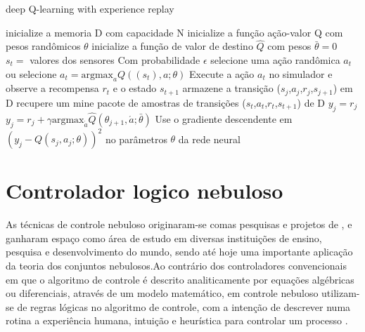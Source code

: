 \documentclass[
	12pt,				%
	openright,			%
	oneside,			%
	a4paper,			%
	brazil,				%
	]{abntex2}
\begin{document}
\begin{algorithm}[H]
\caption{deep Q-learning with experience replay}\label{DQNN}
\begin{algorithmic}[1]
\State inicialize a memoria D com capacidade N
\State inicialize a função ação-valor Q com pesos randômicos $\theta$
\State inicialize a função de valor de destino $\hat{Q}$ com pesos $\bar{\theta} = 0$
\State $s_t =$ valores dos sensores
\State Com probabilidade  $\epsilon$ selecione uma ação randômica $a_t$
\State ou selecione $a_t = \textrm{argmax}_a Q((s_t),a;\theta)$
\State Execute a  ação  $a_t$ no simulador e observe a recompensa $r_t$ e o estado $s_{t+1}$
\State armazene a transição ($s_j$,$a_j$,$r_j$,$s_{j+1}$) em D
\State recupere um mine pacote de amostras de transições ($s_t$,$a_t$,$r_t$,$s_{t+1}$) de D
\State $y_j = r_j$
\Else
\State $y_j = r_j + \gamma\textrm{argmax}_{\acute{a}}\hat{Q}(\theta_{j+1},\acute{a};\bar{\theta}) $
\EndIf
\State Use o gradiente descendente em $(y_j - Q(s_j,a_j;\theta))^2 $ no parâmetros $\theta$ da rede neural
\EndFor
\end{algorithmic}
\end{algorithm}

\section{Controlador logico nebuloso}
As técnicas de controle nebuloso originaram-se comas pesquisas e projetos de \cite{mamdani1976advances} ,\cite{mamdani1976application}  e ganharam espaço como área de estudo em diversas instituições de ensino, pesquisa e desenvolvimento do mundo, sendo até hoje uma importante aplicação da teoria dos conjuntos nebulosos.Ao contrário dos controladores convencionais em que o algoritmo de controle é descrito analiticamente por equações algébricas ou diferenciais, através de um modelo matemático, em controle nebuloso utilizam-se de regras lógicas no algoritmo de controle, com a intenção de descrever numa rotina a experiência humana, intuição e heurística para controlar um processo \cite{sandri1999logica}.
\end{document}
